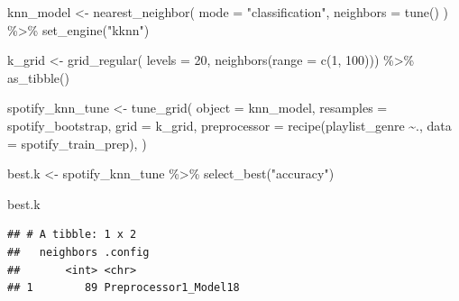 \documentclass[
]{article}
\newenvironment{Shaded}{\begin{snugshade}}{\end{snugshade}}
\newcommand{\AttributeTok}[1]{\textcolor[rgb]{0.77,0.63,0.00}{#1}}
\newcommand{\DecValTok}[1]{\textcolor[rgb]{0.00,0.00,0.81}{#1}}
\newcommand{\FunctionTok}[1]{\textcolor[rgb]{0.00,0.00,0.00}{#1}}
\newcommand{\NormalTok}[1]{#1}
\newcommand{\OtherTok}[1]{\textcolor[rgb]{0.56,0.35,0.01}{#1}}
\newcommand{\SpecialCharTok}[1]{\textcolor[rgb]{0.00,0.00,0.00}{#1}}
\newcommand{\StringTok}[1]{\textcolor[rgb]{0.31,0.60,0.02}{#1}}
\begin{document}
\begin{Shaded}
\begin{Highlighting}[]
\NormalTok{knn\_model }\OtherTok{\textless{}{-}} \FunctionTok{nearest\_neighbor}\NormalTok{(}
  \AttributeTok{mode =} \StringTok{"classification"}\NormalTok{,}
  \AttributeTok{neighbors =} \FunctionTok{tune}\NormalTok{()}
\NormalTok{) }\SpecialCharTok{\%\textgreater{}\%}
  \FunctionTok{set\_engine}\NormalTok{(}\StringTok{"kknn"}\NormalTok{)}

\NormalTok{k\_grid }\OtherTok{\textless{}{-}} \FunctionTok{grid\_regular}\NormalTok{(}
  \AttributeTok{levels =} \DecValTok{20}\NormalTok{,}
  \FunctionTok{neighbors}\NormalTok{(}\AttributeTok{range =} \FunctionTok{c}\NormalTok{(}\DecValTok{1}\NormalTok{, }\DecValTok{100}\NormalTok{))) }\SpecialCharTok{\%\textgreater{}\%}
  \FunctionTok{as\_tibble}\NormalTok{()}

\NormalTok{spotify\_knn\_tune }\OtherTok{\textless{}{-}} \FunctionTok{tune\_grid}\NormalTok{(}
  \AttributeTok{object =}\NormalTok{ knn\_model,}
  \AttributeTok{resamples =}\NormalTok{ spotify\_bootstrap,}
  \AttributeTok{grid =}\NormalTok{ k\_grid,}
  \AttributeTok{preprocessor =} \FunctionTok{recipe}\NormalTok{(playlist\_genre }\SpecialCharTok{\textasciitilde{}}\NormalTok{., }\AttributeTok{data =}\NormalTok{ spotify\_train\_prep),}
\NormalTok{)}


\NormalTok{best.k }\OtherTok{\textless{}{-}}\NormalTok{ spotify\_knn\_tune }\SpecialCharTok{\%\textgreater{}\%} 
  \FunctionTok{select\_best}\NormalTok{(}\StringTok{"accuracy"}\NormalTok{)}

\NormalTok{best.k}
\end{Highlighting}
\end{Shaded}

\begin{verbatim}
## # A tibble: 1 x 2
##   neighbors .config              
##       <int> <chr>                
## 1        89 Preprocessor1_Model18
\end{verbatim}

\begin{Shaded}
\end{Shaded}
\end{document}
